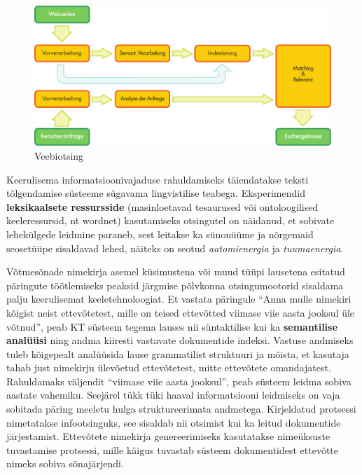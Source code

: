 \begin{multicols}{2}
\begin{figure}[htb]
  \center
  \includegraphics[width=\textwidth]{../_media/german/web_search_architecture}
  \caption{Veebiotsing}
  \label{fig:websearcharch_ee}
\end{figure}

Keerulisema informatsioonivajaduse rahuldamiseks täiendatakse teksti tõlgendamise süsteeme sügavama lingvistilise teabega. 
Eksperimendid \textbf{leksikaalsete ressursside} (masinloetavad tesaurused või ontoloogilised keeleressursid, nt wordnet) kasutamiseks otsingutel on näidanud, et sobivate lehekülgede leidmine paraneb, sest leitakse ka sünonüüme ja nõrgemaid seosetüüpe sisaldavad lehed, näiteks on seotud \textit{aatomienergia} ja \textit{tuumaenergia}. 

Võtmesõnade nimekirja asemel küsimustena või muud tüüpi lausetena esitatud päringute töötlemiseks peaksid järgmise põlvkonna otsingumootorid sisaldama palju keerulisemat keeletehnoloogiat. 
Et vastata päringule ``Anna mulle nimekiri kõigist neist ettevõtetest, mille on teised ettevõtted viimase viie aasta jooksul üle võtnud'', peab KT süsteem tegema lauses nii süntaktilise kui ka \textbf{semantilise analüüsi} ning andma kiiresti vastavate dokumentide indeksi. 
Vastuse andmiseks tuleb kõigepealt analüüsida lause grammatilist struktuuri ja mõista, et kasutaja tahab just nimekirju ülevõetud ettevõtetest, mitte ettevõtete omandajatest. 
Rahuldamaks väljendit ``viimase viie aasta jooksul'', peab süsteem leidma sobiva aastate vahemiku. 
Seejärel tükk tüki haaval informatsiooni leidmiseks on vaja sobitada päring meeletu hulga struktureerimata andmetega. 
Kirjeldatud protsessi nimetatakse infootsinguks, see sisaldab nii otsimist kui ka leitud dokumentide järjestamist. 
Ettevõtete nimekirja genereerimiseks kasutatakse nimeüksuste tuvastamise protsessi, mille käigus tuvastab süsteem dokumentidest ettevõtte nimeks sobiva sõnajärjendi. 



\end{multicols}
